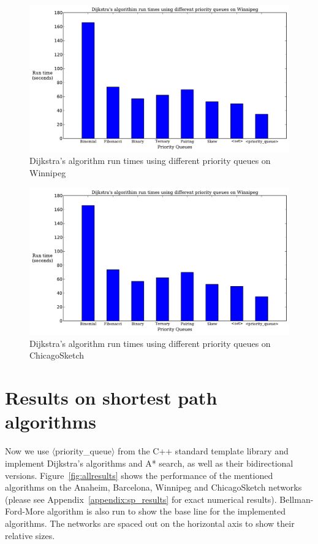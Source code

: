 \begin{figure}[H]
    \centering
    \includegraphics[page=1, width=\textwidth, height=.4\textheight]{img/pq_runtime}
    \caption{Dijkstra's algorithm run times using different priority queues on Winnipeg}
    \label{fig:pq_runtime2}
\end{figure}
\begin{figure}[H]
    \centering
    \includegraphics[page=2, width=\textwidth, height=.4\textheight]{img/pq_runtime}
    \caption{Dijkstra's algorithm run times using different priority queues on ChicagoSketch}
    \label{fig:pq_runtime}
\end{figure}

\section{Results on shortest path algorithms}
Now we use $\langle$priority\_queue$\rangle$ from the C++ standard template library and implement Dijkstra's algorithms and A* search, as well as their bidirectional versions.
Figure~\ref{fig:allresults} shows the performance of the mentioned algorithms on the Anaheim, Barcelona, Winnipeg and ChicagoSketch networks
(please see Appendix~\ref{appendix:sp_results} for exact numerical results).
Bellman-Ford-More algorithm is also run to show the base line for the implemented algorithms.
The networks are spaced out on the horizontal axis to show their relative sizes.


